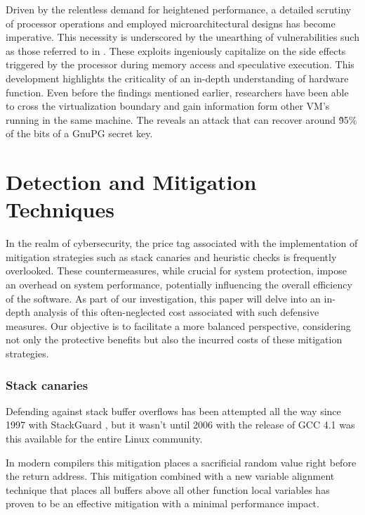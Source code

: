 \documentclass{article}
\begin{document}
Driven by the relentless demand for heightened performance, a detailed scrutiny
of processor operations and employed microarchitectural designs has become
imperative. This necessity is underscored by the unearthing of vulnerabilities
such as those referred to in \cite{spectre, meltdown}. These exploits
ingeniously capitalize on the side effects triggered by the processor during
memory access and speculative execution. This development highlights the
criticality of an in-depth understanding of hardware function. Even before
the findings mentioned earlier, researchers have been able to cross the
virtualization boundary and gain information form other VM's running in the same
machine. The \cite{flush reload} reveals an attack that can recover around \~95\%
of the bits of a GnuPG secret key.

\section{Detection and Mitigation Techniques}%
In the realm of cybersecurity, the price tag associated with the implementation
of mitigation strategies such as stack canaries and heuristic checks is
frequently overlooked. These countermeasures, while crucial for system
protection, impose an overhead on system performance, potentially influencing
the overall efficiency of the software. As part of our investigation, this paper
will delve into an in-depth analysis of this often-neglected cost associated
with such defensive measures. Our objective is to facilitate a more balanced
perspective, considering not only the protective benefits but also the incurred
costs of these mitigation strategies.

\subsubsection{Stack canaries}
Defending against stack buffer overflows has been attempted all the way since 1997
with StackGuard \cite{stackguardpaper}, but it wasn't until 2006 with the release
of GCC 4.1 was this available for the entire Linux community.

In modern compilers this mitigation places a sacrificial random value right before the
return address. This mitigation combined with a new variable alignment technique that
places all buffers above all other function local variables has proven to be an
effective mitigation with a minimal performance impact.
\end{document}
